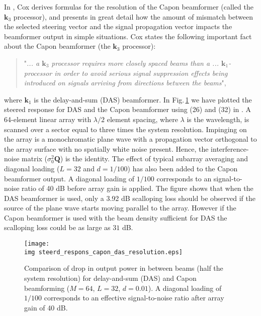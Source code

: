 \documentclass[journal]{IEEEtran}
\newcommand{\mat}[1]{\mathbf{#1}}
\renewcommand{\vec}[1]{\mathbf{#1}}
\newcommand{\img}{img/}
\begin{document}
In \cite{Cox1973}, Cox derives formulas for the resolution of the Capon beamformer (called the $\vec{k}_3$ processor), and presents in great detail how the amount of mismatch between the selected steering vector and the signal propagation vector impacts the beamformer output in simple situations. Cox states the following important fact about the Capon beamformer (the $\vec{k}_3$ processor): 
\begin{quote}
"\textit{... a $\vec{k}_3$ processor requires more closely spaced beams than a ... $\vec{k}_1$-processor in order to avoid serious signal suppression effects being introduced on signals arriving from directions between the beams}", 
\end{quote}
where $\vec{k}_1$ is the delay-and-sum (DAS) beamformer. In Fig.\,\ref{fig:das_capon_beams} we have plotted the steered response for DAS and the Capon beamformer using (26) and (32) in \cite{Cox1973}. A 64-element linear array with $\lambda/2$ element spacing, where $\lambda$ is the wavelength, is scanned over a sector equal to three times the system resolution. Impinging on the array is a monochromatic plane wave with a propagation vector orthogonal to the array surface with no spatially white noise present. Hence, the interference-noise matrix ($\sigma_0^2\mat{Q}$) is the identity. The effect of typical subarray averaging and diagonal loading ($L=32$ and $d=1/100$) has also been added to the Capon beamformer output. A diagonal loading of $1/100$ corresponds to an signal-to-noise ratio of 40 dB before array gain is applied. The figure shows that when the DAS beamformer is used, only a 3.92 dB scalloping loss \cite{Harris1978} should be observed if the source of the plane wave starts moving parallel to the array. However if the Capon beamformer is used with the beam density sufficient for DAS the scalloping loss could be as large as $31$ dB.

\begin{figure}[!t]
\centerline{
\texttt{[image: \\img steerd\_respons\_capon\_das\_resolution.eps]}
}
\caption{Comparison of drop in output power in between beams (half the system resolution) for delay-and-sum (DAS) and Capon beamforming ($M=64$, $L=32$, $d=0.01$). A diagonal loading of $1/100$ corresponds to an effective signal-to-noise ratio after array gain of 40 dB.}
\label{fig:das_capon_beams}
\end{figure}
\end{document}
